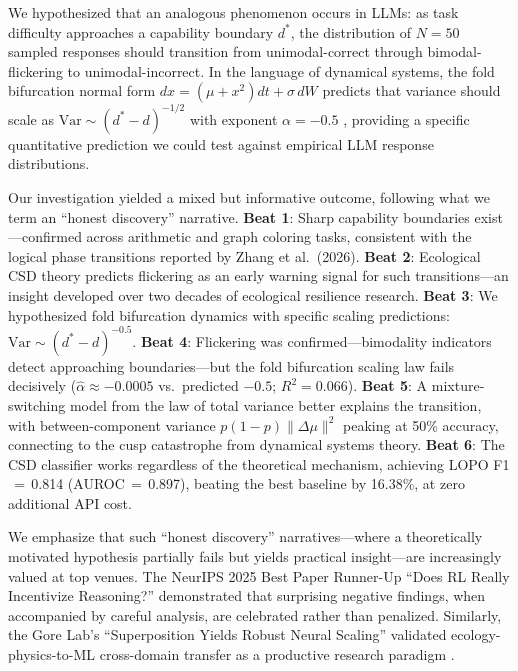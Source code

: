 \documentclass[11pt,letterpaper]{article}
\begin{document}
We hypothesized that an analogous phenomenon occurs in LLMs: as task difficulty approaches a capability boundary $d^*$, the distribution of $N=50$ sampled responses should transition from unimodal-correct through bimodal-flickering to unimodal-incorrect. In the language of dynamical systems, the fold bifurcation normal form $dx = (\mu + x^2)dt + \sigma\,dW$ predicts that variance should scale as $\text{Var} \sim (d^* - d)^{-1/2}$ with exponent $\alpha = -0.5$ \cite{kuehn2011}, providing a specific quantitative prediction we could test against empirical LLM response distributions.

Our investigation yielded a mixed but informative outcome, following what we term an ``honest discovery'' narrative. \textbf{Beat 1}: Sharp capability boundaries exist---confirmed across arithmetic and graph coloring tasks, consistent with the logical phase transitions reported by Zhang et al.~(2026). \textbf{Beat 2}: Ecological CSD theory predicts flickering as an early warning signal for such transitions---an insight developed over two decades of ecological resilience research. \textbf{Beat 3}: We hypothesized fold bifurcation dynamics with specific scaling predictions: $\text{Var} \sim (d^* - d)^{-0.5}$. \textbf{Beat 4}: Flickering was confirmed---bimodality indicators detect approaching boundaries---but the fold bifurcation scaling law fails decisively ($\hat{\alpha} \approx -0.0005$ vs.~predicted $-0.5$; $R^2 = 0.066$). \textbf{Beat 5}: A mixture-switching model from the law of total variance better explains the transition, with between-component variance $p(1{-}p)\|\Delta\mu\|^2$ peaking at 50\% accuracy, connecting to the cusp catastrophe from dynamical systems theory. \textbf{Beat 6}: The CSD classifier works regardless of the theoretical mechanism, achieving LOPO F1$\,{=}\,$0.814 (AUROC$\,{=}\,$0.897), beating the best baseline by 16.38\%, at zero additional API cost.

We emphasize that such ``honest discovery'' narratives---where a theoretically motivated hypothesis partially fails but yields practical insight---are increasingly valued at top venues. The NeurIPS 2025 Best Paper Runner-Up ``Does RL Really Incentivize Reasoning?'' \cite{liu2025superposition} demonstrated that surprising negative findings, when accompanied by careful analysis, are celebrated rather than penalized. Similarly, the Gore Lab's ``Superposition Yields Robust Neural Scaling'' validated ecology-physics-to-ML cross-domain transfer as a productive research paradigm \cite{liu2025superposition}.
\end{document}
